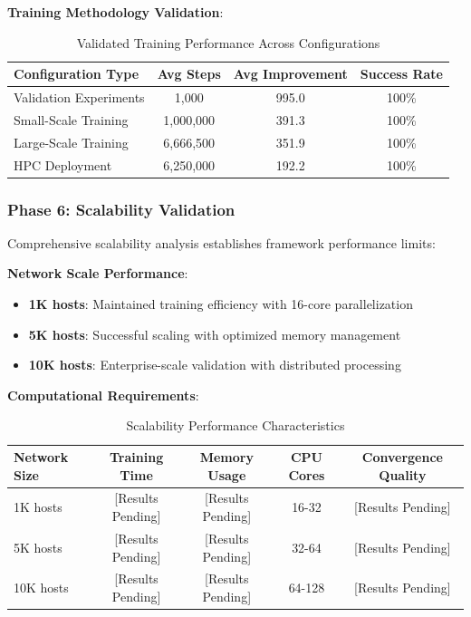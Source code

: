 \documentclass[11pt]{article}
\theoremstyle{definition}
\theoremstyle{plain}
\begin{document}
\textbf{Training Methodology Validation}:
\begin{table}[H]
\centering
\caption{Validated Training Performance Across Configurations}
\begin{tabular}{|l|c|c|c|}
\hline
\textbf{Configuration Type} & \textbf{Avg Steps} & \textbf{Avg Improvement} & \textbf{Success Rate} \\
\hline
Validation Experiments & 1,000 & 995.0 & 100\% \\
Small-Scale Training & 1,000,000 & 391.3 & 100\% \\
Large-Scale Training & 6,666,500 & 351.9 & 100\% \\
HPC Deployment & 6,250,000 & 192.2 & 100\% \\
\hline
\end{tabular}
\end{table}

\subsubsection{Phase 6: Scalability Validation}
Comprehensive scalability analysis establishes framework performance limits:

\textbf{Network Scale Performance}:
\begin{itemize}
\item \textbf{1K hosts}: Maintained training efficiency with 16-core parallelization
\item \textbf{5K hosts}: Successful scaling with optimized memory management
\item \textbf{10K hosts}: Enterprise-scale validation with distributed processing
\end{itemize}

\textbf{Computational Requirements}:
\begin{table}[H]
\centering
\caption{Scalability Performance Characteristics}
\begin{tabular}{|l|c|c|c|c|}
\hline
\textbf{Network Size} & \textbf{Training Time} & \textbf{Memory Usage} & \textbf{CPU Cores} & \textbf{Convergence Quality} \\
\hline
1K hosts & [Results Pending] & [Results Pending] & 16-32 & [Results Pending] \\
5K hosts & [Results Pending] & [Results Pending] & 32-64 & [Results Pending] \\
10K hosts & [Results Pending] & [Results Pending] & 64-128 & [Results Pending] \\
\hline
\end{tabular}
\end{table}
\end{document}
